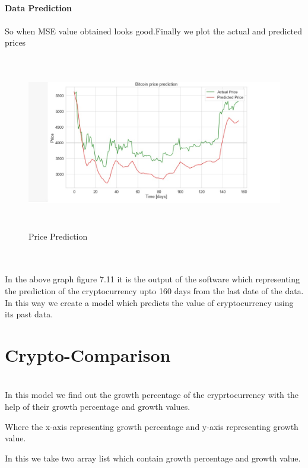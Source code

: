 \documentclass[openany,12pt]{report}
\begin{document}
{{{{\\
\newpage
\item{\textbf{Data Prediction}\\
\\
So when MSE value obtained looks good.Finally we plot the actual and predicted prices
\begin{figure}[H]
\centering
\includegraphics[width=5in,height=3in]{./Prediction.jpeg}
\caption{Price Prediction}
\end{figure}
\\ \\
In the above graph figure 7.11 it is the output of the software which representing the prediction of the cryptocurrency upto 160 days from the last date of the data.\\

In this way we create a model which predicts the value of cryptocurrency using its past data.

\clearpage
\section{Crypto-Comparison}\\

In this model we find out the growth percentage of the cryprtocurrency with the help of their growth percentage and growth values.

Where the x-axis representing growth percentage and y-axis representing growth value.

In this we take two array list which contain growth percentage and growth value.

}}}}}
\end{document}
